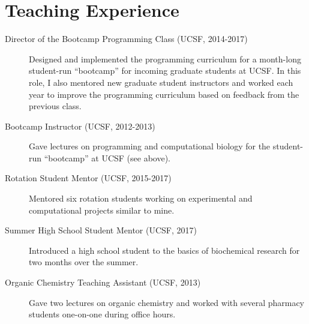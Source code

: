 \section{Teaching Experience}

\begin{description}

\item[Director of the Bootcamp Programming Class (UCSF, 2014-2017)]
        Designed and implemented the programming curriculum for a month-long 
        student-run ``bootcamp'' for incoming graduate students at UCSF.  In 
        this role, I also mentored new graduate student instructors and worked 
        each year to improve the programming curriculum based on feedback from 
        the previous class.

\item[Bootcamp Instructor (UCSF, 2012-2013)]
        Gave lectures on programming and computational biology for the 
        student-run ``bootcamp'' at UCSF (see above).

\item[Rotation Student Mentor (UCSF, 2015-2017)]
        Mentored six rotation students working on experimental and 
        computational projects similar to mine.

\item[Summer High School Student Mentor (UCSF, 2017)]
        Introduced a high school student to the basics of biochemical research 
        for two months over the summer.

\item[Organic Chemistry Teaching Assistant (UCSF, 2013)]
        Gave two lectures on organic chemistry and worked with several pharmacy 
        students one-on-one during office hours.

\end{description}


